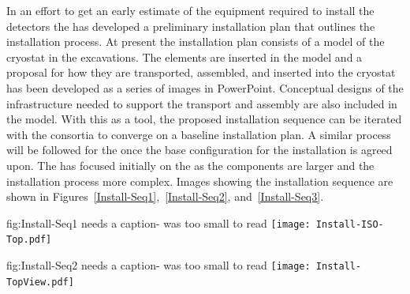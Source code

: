 In an effort to get an early estimate of the equipment required to
install the detectors the  has developed a preliminary
installation plan that outlines the installation process. At present
the installation plan consists of a \threed model of the cryostat in the
excavations. The  elements are inserted in the
model and a proposal for how they are transported, assembled, and
inserted into the cryostat has been developed as a series of images in
PowerPoint. 
Conceptual designs of the infrastructure needed to support
the transport and assembly are also included in the model. With this
as a tool, the proposed installation sequence can be iterated with the
consortia to converge on a baseline installation plan. A similar
process will be followed for the  once the base
configuration for the  installation is agreed upon. The
 has focused initially on the  as the
 components are larger and the installation process more
complex. Images showing the  installation sequence are shown
in Figures~\ref{Install-Seq1},~\ref{Install-Seq2}, and~\ref{Install-Seq3}.

\begin{dunefigure}{fig:Install-Seq1}
  {needs a caption- was too small to read}
\texttt{[image: Install-ISO-Top.pdf]}
\end{dunefigure}

\begin{dunefigure}{fig:Install-Seq2}
  {needs a caption- was too small to read}
\texttt{[image: Install-TopView.pdf]}
\end{dunefigure}

